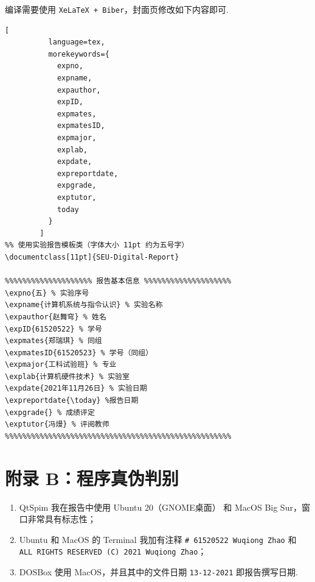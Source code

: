 \documentclass[11pt]{SEU-Digital-Report}
\begin{document}
        编译需要使用 \texttt{XeLaTeX + Biber}，封面页修改如下内容即可.
        \begin{lstlisting}[
          language=tex,
          morekeywords={
            expno,
            expname,
            expauthor,
            expID,
            expmates,
            expmatesID,
            expmajor,
            explab,
            expdate,
            expreportdate,
            expgrade,
            exptutor,
            today
          }
        ]
%% 使用实验报告模板类（字体大小 11pt 约为五号字）
\documentclass[11pt]{SEU-Digital-Report}

%%%%%%%%%%%%%%%%%%%% 报告基本信息 %%%%%%%%%%%%%%%%%%%%
\expno{五} % 实验序号
\expname{计算机系统与指令认识} % 实验名称
\expauthor{赵舞穹} % 姓名
\expID{61520522} % 学号
\expmates{郑瑞琪} % 同组
\expmatesID{61520523} % 学号（同组）
\expmajor{工科试验班} % 专业
\explab{计算机硬件技术} % 实验室
\expdate{2021年11月26日} % 实验日期
\expreportdate{\today} %报告日期
\expgrade{} % 成绩评定
\exptutor{冯熳} % 评阅教师
%%%%%%%%%%%%%%%%%%%%%%%%%%%%%%%%%%%%%%%%%%%%%%%%%%%%
        \end{lstlisting}

    \section*{附录 B：程序真伪判别}

    \begin{enumerate}
      \item QtSpim 我在报告中使用 Ubuntu 20（GNOME桌面） 和 MacOS Big Sur，窗口非常具有标志性；
      \item Ubuntu 和 MacOS 的 Terminal 我加有注释 \texttt{\# 61520522 Wuqiong Zhao} 和 \texttt{ALL RIGHTS RESERVED (C) 2021 Wuqiong Zhao}；
      \item DOSBox 使用 MacOS，并且其中的文件日期 \texttt{13-12-2021} 即报告撰写日期.
    \end{enumerate}
\end{document}
